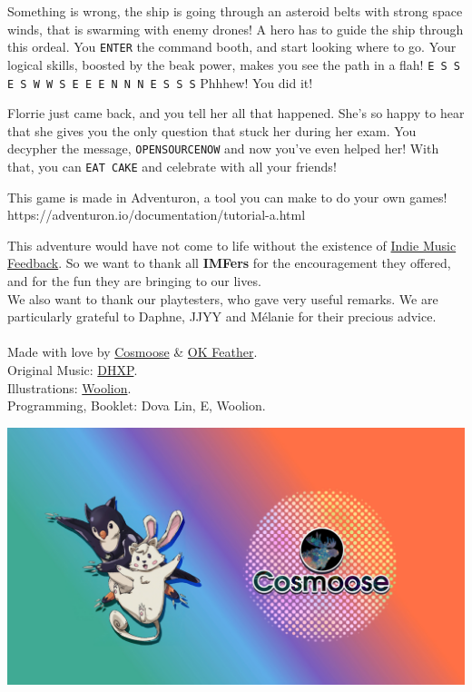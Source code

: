\documentclass{article}
\newcommand{\bbro}[1] {\textbf{\textcolor{darksienna}{#1}}}
\newcommand{\bckg}[1]{\AddToShipoutPictureBG*{\texttt{[image: \#1]}}}
\begin{document}
Something is wrong, the ship is going through an asteroid belts with strong space winds,
that is swarming with enemy drones! A hero has to guide the ship through this ordeal.
You \texttt{ENTER} the command booth, and start looking where to go.
Your logical skills, boosted by the beak power, makes you see the path in a flah!
\texttt{E S S E S W W S E E E N N N E S S S}
Phhhew! You did it!

Florrie just came back, and you tell her all that happened.
She's so happy to hear that she gives you the only question that stuck her during her exam.
You decypher the message, \texttt{OPENSOURCENOW} and now you've even helped her!
With that, you can \texttt{EAT CAKE} and celebrate with all your friends!

\clearpage

\bckg{img/bg}

This game is made in Adventuron, a tool you can make to do your own games!
https://adventuron.io/documentation/tutorial-a.html

This adventure would have not come to life without the existence of \href{https://indiemusicfeedback.com}{Indie Music Feedback}.
So we want to thank all \bbro{IMFers} for the encouragement they offered, and for the fun they are bringing to our lives.\\

We also want to thank our playtesters, who gave very useful remarks. We are particularly grateful to Daphne, JJYY and Mélanie for their precious advice.\\

\phantom{*}\\
Made with love by \href{https://cosmoose.org/}{Cosmoose} \& \href{https://okfeather.com/}{OK Feather}.\\
Original Music: \href{https://linktr.ee/dhxp}{DHXP}.\\
Illustrations: \href{https://twitter.com/wooliondraws}{Woolion}.\\
Programming, Booklet: Dova Lin, E, Woolion.

\vspace*{\fill}

\begin{center}
    \includegraphics[height=.3\paperheight]{img/ccend}
\end{center}


\clearpage
\end{document}
